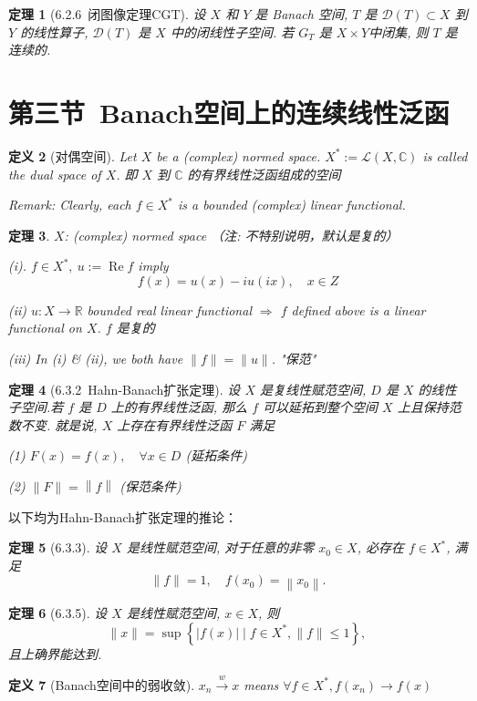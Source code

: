 \documentclass[10pt,openany]{book}
\theoremstyle{thmstyle} %
\newtheorem{theorem}{定理}[chapter]
\theoremstyle{defstyle} %
\newtheorem{definition}[theorem]{定义}
\theoremstyle{prostyle} %
\begin{document}
\begin{theorem}[6.2.6~闭图像定理CGT] 
设 $X$ 和 $Y$ 是 Banach 空间, $T$ 是 $\mathcal{D}(T) \subset X$ 到 $Y$ 的线性算子, $\mathcal{D}(T)$ 是 $X$ 中的闭线性子空间. 若 $G_T$ 是 $X \times Y$中闭集, 则 $T$ 是连续的.
\end{theorem}

\section{第三节~Banach空间上的连续线性泛函}

\begin{definition}[对偶空间]
Let $X$ be a (complex) normed space. $X^*:=\mathcal{L}(X, \mathbb{C})$ is called the dual space of $X$. 即 $X$ 到 $\mathbb{C}$ 的有界线性泛函组成的空间

Remark: Clearly, each $f \in X^*$ is a bounded (complex) linear functional.
\end{definition}

\begin{theorem}
$X$: (complex) normed space （注: 不特别说明，默认是复的）

(i). $f \in X^*, ~ u:=\operatorname{Re} f$ imply
$$
f(x)=u(x)-i u(i x), \quad x \in Z 
$$

(ii) $ u: X \rightarrow \mathbb{R}$ bounded real linear functional 
$\Rightarrow$  $f$ defined above is a linear functional on $X$. $f$ 是复的

(iii) In (i) \& (ii), we both have $\|f\|=\|u\|$. "保范"
\end{theorem}

\begin{theorem}[6.3.2~Hahn-Banach扩张定理]
设 $X$ 是复线性赋范空间, $D$ 是 $X$ 的线性子空间.若 $f$ 是 $D$ 上的有界线性泛函, 那么 $f$ 可以延拓到整个空间 $X$ 上且保持范数不变. 就是说, $X$ 上存在有界线性泛函 $F$ 满足

(1) $F(x)=f(x), \quad \forall x \in D$ (延拓条件)

(2) $\|F\|=\left\|f\right\|$ (保范条件)
\end{theorem}

以下均为Hahn-Banach扩张定理的推论：
\begin{theorem}[6.3.3]
设 $X$ 是线性赋范空间, 对于任意的非零 $x_0 \in X$, 必存在 $f \in X^*$, 满足
$$
\|f\|=1, \quad f\left(x_0\right)=\left\|x_0\right\| .
$$
\end{theorem}

\begin{theorem}[6.3.5]
设 $X$ 是线性赋范空间, $x \in X$, 则
$$
\|x\|=\sup \left\{|f(x)| \mid f \in X^*,\|f\| \leq 1\right\} \text {, }
$$
且上确界能达到.
\end{theorem}

\begin{definition}[Banach空间中的弱收敛]
$x_n \xrightarrow{w} x$ means $\forall f \in X^*, f\left(x_n\right) \rightarrow f(x)$
\end{definition}
\end{document}
